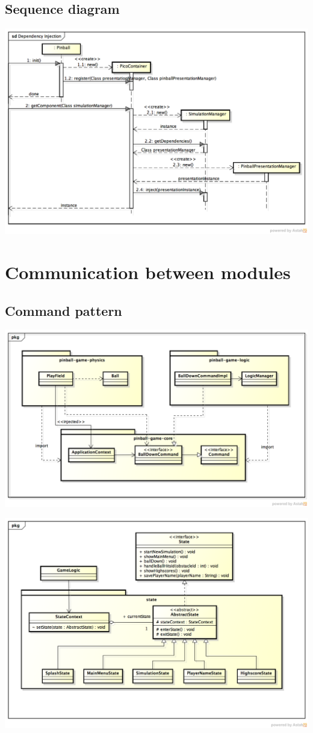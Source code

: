 \documentclass[fontsize=12pt,
               paper=a4,
               twoside=false,
               parskip=half,
               ]{scrartcl}
\begin{document}
\subsection{Sequence diagram}
\includegraphics[width=15.5cm]{./img/dependency-injection-sd.png}

\section{Communication between modules}
\subsection{Command pattern}
\includegraphics[width=15.5cm]{./img/command-pattern1.png}

\includegraphics[width=15.5cm]{./img/command-pattern2.png}
\end{document}
